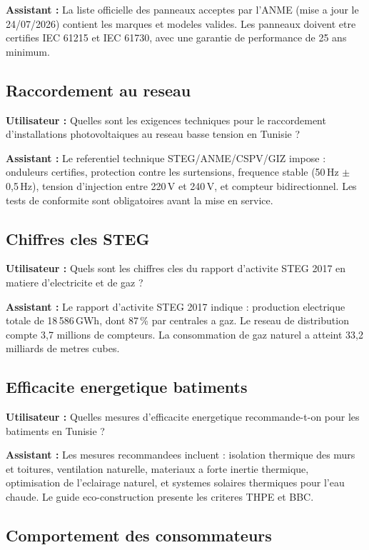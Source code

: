 \documentclass[12pt,a4paper,oneside]{article}
\newcommand{\prompt}[1]{%
  \noindent\colorbox{PromptBg}{\parbox{\dimexpr\linewidth-2\fboxsep}{%
    \small\textbf{\textcolor{MainBlue}{Utilisateur :}} #1%
  }}\vspace{3pt}%
}
\newcommand{\botreply}[1]{%
  \noindent\colorbox{OutputBg}{\parbox{\dimexpr\linewidth-2\fboxsep}{%
    \small\textbf{\textcolor{PassGreen!70!black}{Assistant :}} #1%
  }}\vspace{6pt}%
}
\begin{document}
\botreply{
La liste officielle des panneaux acceptes par l'ANME (mise a jour le 24/07/2026) contient les marques et modeles valides. Les panneaux doivent etre certifies IEC 61215 et IEC 61730, avec une garantie de performance de 25 ans minimum.
}

\subsection{Raccordement au reseau}

\prompt{Quelles sont les exigences techniques pour le raccordement d'installations photovoltaiques au reseau basse tension en Tunisie ?}

\botreply{
Le referentiel technique STEG/ANME/CSPV/GIZ impose : onduleurs certifies, protection contre les surtensions, frequence stable (50\,Hz $\pm$ 0,5\,Hz), tension d'injection entre 220\,V et 240\,V, et compteur bidirectionnel. Les tests de conformite sont obligatoires avant la mise en service.
}

\subsection{Chiffres cles STEG}

\prompt{Quels sont les chiffres cles du rapport d'activite STEG 2017 en matiere d'electricite et de gaz ?}

\botreply{
Le rapport d'activite STEG 2017 indique : production electrique totale de 18\,586\,GWh, dont 87\,\% par centrales a gaz. Le reseau de distribution compte 3,7 millions de compteurs. La consommation de gaz naturel a atteint 33,2 milliards de metres cubes.
}

\subsection{Efficacite energetique batiments}

\prompt{Quelles mesures d'efficacite energetique recommande-t-on pour les batiments en Tunisie ?}

\botreply{
Les mesures recommandees incluent : isolation thermique des murs et toitures, ventilation naturelle, materiaux a forte inertie thermique, optimisation de l'eclairage naturel, et systemes solaires thermiques pour l'eau chaude. Le guide eco-construction presente les criteres THPE et BBC.
}

\subsection{Comportement des consommateurs}
\end{document}

